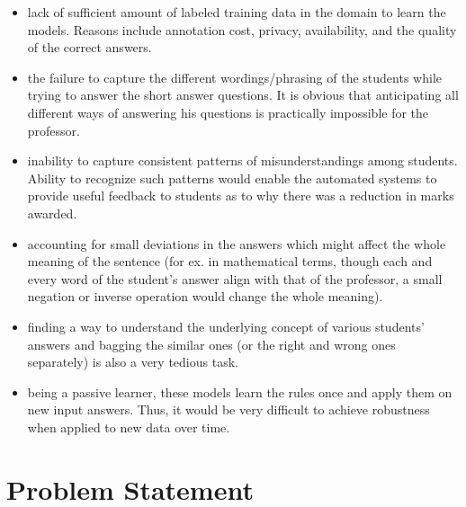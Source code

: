 \begin{itemize}
	
	\item lack of sufficient amount of labeled training data in the domain to learn the models. Reasons include annotation cost, privacy, availability, and the quality of the correct answers.
	
	\item the failure to capture the different wordings/phrasing of the students while trying to answer the short answer questions. It is obvious that anticipating all different ways of answering his questions is practically impossible for the professor. 
		
	\item inability to capture consistent patterns of misunderstandings among students. Ability to recognize such patterns would enable the automated systems to provide useful feedback to students as to why there was a reduction in marks awarded.
	
	\item accounting for small deviations in the answers which might affect the whole meaning of the sentence (for ex. in mathematical terms, though each and every word of the student's answer align with that of the professor, a small negation or inverse operation would change the whole meaning).
	
	\item finding a way to understand the underlying concept of various students' answers and bagging the similar ones (or the right and wrong ones separately) is also a very tedious task. 
	
	\item being a passive learner, these models learn the rules once and apply them on new input answers. Thus, it would be very difficult to achieve robustness when applied to new data over time. \\
	
\end{itemize}

\section{Problem Statement}

